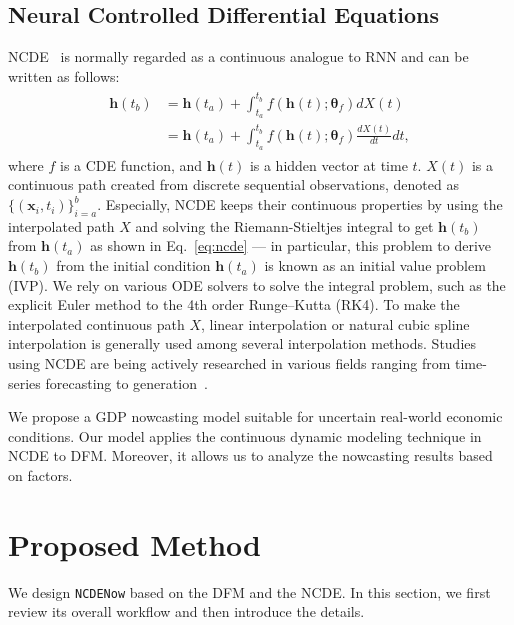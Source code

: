 \documentclass[sigconf]{acmart}
\begin{document}
\subsection{Neural Controlled Differential Equations}
NCDE~\cite{kidger2020neural} is normally regarded as a continuous analogue to RNN and can be written as follows:
\begin{align}\begin{split}
\mathbf{h}(t_b) 
&= \mathbf{h}(t_a) + \int_{t_a}^{t_b} f(\mathbf{h}(t);\mathbf{\theta}_f) dX(t)\\
&= \mathbf{h}(t_a) + \int_{t_a}^{t_b} f(\mathbf{h}(t);\mathbf{\theta}_f) \frac{dX(t)}{dt} dt,\label{eq:ncde}
\end{split}\end{align}
where $f$ is a CDE function, and $\mathbf{h}(t)$ is a hidden vector at time $t$. $X(t)$ is a continuous path created from discrete sequential observations, denoted as $\{(\mathbf{x}_i, t_i)\}_{i=a}^b$.
Especially, NCDE keeps their continuous properties by using the interpolated path $X$ and solving the Riemann-Stieltjes integral to get $\mathbf{h}(t_b)$ from $\mathbf{h}(t_a)$ as shown in Eq.~\eqref{eq:ncde} --- in particular, this problem to derive $\mathbf{h}(t_b)$ from the initial condition $\mathbf{h}(t_a)$ is known as an initial value problem (IVP).
We rely on various ODE solvers to solve the integral problem, such as the explicit Euler method to the 4th order Runge–Kutta (RK4). 
To make the interpolated continuous path $X$, linear interpolation or natural cubic spline interpolation is generally used among several interpolation methods. 
Studies using NCDE are being actively researched in various fields ranging from time-series forecasting to generation~\cite{jhin2021attentive,choi2022graph,jeon2022gt,jhin2022exit,hong2022timekit,jo2023hpcde,lee2023hypernetwork,wi2024continuous,choi2023graph}.

We propose a GDP nowcasting model suitable for uncertain real-world economic conditions. Our model applies the continuous dynamic modeling technique in NCDE to DFM. Moreover, it allows us to analyze the nowcasting results based on factors.



\section{Proposed Method}\label{sec:method}
We design \texttt{NCDENow} based on the DFM and the NCDE. In this section, we first review its overall workflow and then introduce the details.
\end{document}
